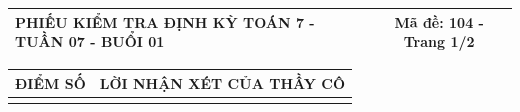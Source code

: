 \documentclass[12pt,a4paper]{article}
\begin{document}
\newpage


\noindent
\begin{tabularx}{\linewidth}{|X|c|}
\hline
\textbf{PHIẾU KIỂM TRA ĐỊNH KỲ TOÁN 7 - TUẦN 07 - BUỔI 01} & \textbf{Mã đề: 104 - Trang 1/2} \\
\hline
\end{tabularx}

\vspace{1.2mm}

\noindent
\begin{tabularx}{\linewidth}{|p{3.2cm}|X|}
\hline
\centering\textbf{ĐIỂM SỐ} & \centering\textbf{LỜI NHẬN XÉT CỦA THẦY CÔ} \tabularnewline
\hline
\rule{0pt}{1.8cm} & \tabularnewline
\hline
\end{tabularx}

\vspace{1.5mm}
\end{document}

